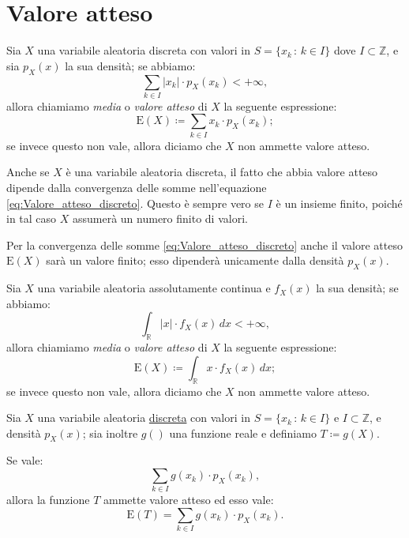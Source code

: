     \section{Valore atteso}\label{sec:Valore_atteso}
    \begin{defn}[discreto]\label{defn:Valore_atteso_discreto}
            Sia $X$ una variabile aleatoria discreta con valori in $S = \{x_k \,:\, k \in I\}$ dove $I \subset \mathbb{Z}$, e sia $p_X(x)$ la sua densità; se abbiamo: \[
                \sum_{k \in I} \left|x_k\right| \cdot p_X(x_k) < +\infty
            ,\] allora chiamiamo \emph{media} o \emph{valore atteso} di $X$ la seguente espressione:
            \begin{equation}\label{eq:Valore_atteso_discreto}
                \text{E}(X) \coloneqq \sum_{k \in I}x_k \cdot p_X(x_k)
            ;\end{equation}
            se invece questo non vale, allora diciamo che $X$ non ammette valore atteso.
        \end{defn}
        \begin{obsv}
            Anche se $X$ è una variabile aleatoria discreta, il fatto che abbia valore atteso dipende dalla convergenza delle somme nell'equazione \eqref{eq:Valore_atteso_discreto}. Questo è sempre vero se $I$ è un insieme finito, poiché in tal caso $X$ assumerà un numero finito di valori.

            Per la convergenza delle somme \eqref{eq:Valore_atteso_discreto} anche il valore atteso $\text{E}(X)$ sarà un valore finito; esso dipenderà unicamente dalla densità $p_X(x)$.
        \end{obsv}
        \begin{defn}[continuo]\label{defn:Valore_atteso_continuo}
            Sia $X$ una variabile aleatoria assolutamente continua e $f_X(x)$ la sua densità; se abbiamo: \[
                \int_{\mathbb{R}} |x| \cdot f_X(x)\, dx < +\infty 
            ,\] allora chiamiamo \emph{media} o \emph{valore atteso}  di $X$ la seguente espressione:
            \begin{equation}\label{eq:Valore_atteso_continuo}
                \text{E}(X) \coloneqq \int_{\mathbb{R}} x \cdot f_X(x)\, dx
            ;\end{equation}
            se invece questo non vale, allora diciamo che $X$ non ammette valore atteso.
        \end{defn}
        \begin{defn}[discreta]
            Sia $X$ una variabile aleatoria \underline{discreta} con valori in $S = \{x_k \,:\, k \in I\}$ e $I \subset \mathbb{Z}$, e densità $p_X(x)$; sia inoltre $g()$ una funzione reale  e definiamo $T \coloneqq  g(X)$.

            Se vale: \[
                \sum_{k \in I} g(x_k)  \cdot p_X(x_k)
            ,\] allora la funzione $T$ ammette valore atteso ed esso vale:
            \begin{equation}\label{eq:Valore_atteso_funzione_discreta}
                \text{E}(T) = \sum_{k \in I} g(x_k) \cdot p_X(x_k)
            .\end{equation}
        \end{defn}
